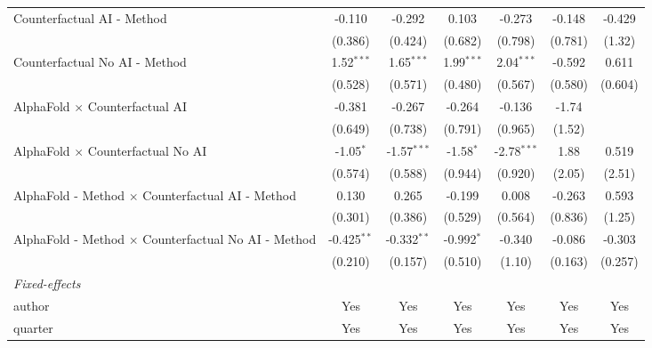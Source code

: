 \begin{tabular}{lcccccc}
   Counterfactual AI - Method                                 & -0.110        & -0.292        & 0.103        & -0.273        & -0.148  & -0.429\\   
                                                              & (0.386)       & (0.424)       & (0.682)      & (0.798)       & (0.781) & (1.32)\\   
   Counterfactual No AI - Method                              & 1.52$^{***}$  & 1.65$^{***}$  & 1.99$^{***}$ & 2.04$^{***}$  & -0.592  & 0.611\\   
                                                              & (0.528)       & (0.571)       & (0.480)      & (0.567)       & (0.580) & (0.604)\\   
   AlphaFold $\times$ Counterfactual AI                       & -0.381        & -0.267        & -0.264       & -0.136        & -1.74   &   \\   
                                                              & (0.649)       & (0.738)       & (0.791)      & (0.965)       & (1.52)  &   \\   
   AlphaFold $\times$ Counterfactual No AI                    & -1.05$^{*}$   & -1.57$^{***}$ & -1.58$^{*}$  & -2.78$^{***}$ & 1.88    & 0.519\\   
                                                              & (0.574)       & (0.588)       & (0.944)      & (0.920)       & (2.05)  & (2.51)\\   
   AlphaFold - Method $\times$ Counterfactual AI - Method     & 0.130         & 0.265         & -0.199       & 0.008         & -0.263  & 0.593\\   
                                                              & (0.301)       & (0.386)       & (0.529)      & (0.564)       & (0.836) & (1.25)\\   
   AlphaFold - Method $\times$ Counterfactual No AI - Method  & -0.425$^{**}$ & -0.332$^{**}$ & -0.992$^{*}$ & -0.340        & -0.086  & -0.303\\   
                                                              & (0.210)       & (0.157)       & (0.510)      & (1.10)        & (0.163) & (0.257)\\   
   \midrule
   \emph{Fixed-effects}\\
   author                                                     & Yes           & Yes           & Yes          & Yes           & Yes     & Yes\\  
   quarter                                                    & Yes           & Yes           & Yes          & Yes           & Yes     & Yes\\  

\end{tabular}
